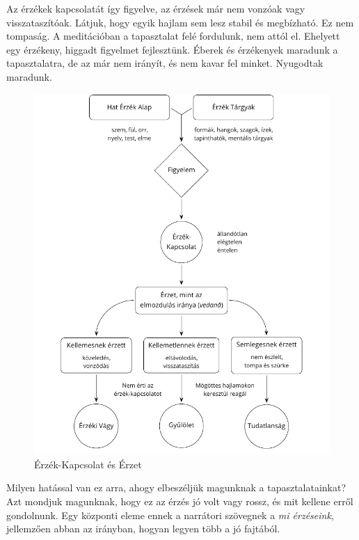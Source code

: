 Az érzékek kapcsolatát így figyelve, az érzések már nem vonzóak vagy
visszataszítóak. Látjuk, hogy egyik hajlam sem lesz stabil és
megbízható. Ez nem tompaság. A meditációban a tapasztalat felé
fordulunk, nem attól el. Ehelyett egy érzékeny, higgadt figyelmet
fejlesztünk. Éberek és érzékenyek maradunk a tapasztalatra, de az már
nem irányít, és nem kavar fel minket. Nyugodtak maradunk.

\clearpage
\figurepagelayout

\begin{figure}[h]
\caption{Érzék-Kapcsolat és Érzet}\label{fig-sense-contact-feeling}
\bigskip
\includegraphics[width=\linewidth]{./manuscript/tex/diagrams/sense-contact-feeling-hu.pdf}
\end{figure}

\clearpage
\normalpagelayout


Milyen hatással van ez arra, ahogy elbeszéljük magunknak a
tapasztalatainkat? Azt mondjuk magunknak, hogy ez az érzés jó volt vagy
rossz, és mit kellene erről gondolnunk. Egy központi eleme ennek a
narrátori szövegnek a \emph{mi érzéseink}, jellemzően abban az irányban,
hogyan legyen több a jó fajtából.

